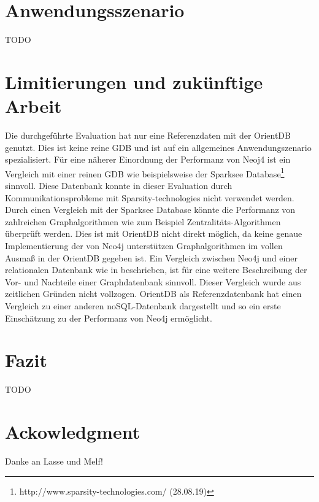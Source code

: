 \section{Anwendungsszenario}
TODO
\section{Limitierungen und zukünftige Arbeit}
Die durchgeführte Evaluation hat nur eine Referenzdaten mit der OrientDB genutzt. Dies ist keine reine GDB und ist auf ein allgemeines Anwendungszenario spezialisiert. Für eine näherer Einordnung der Performanz von Neoj4 ist ein Vergleich mit einer reinen GDB wie beispielsweise der Sparksee Database\footnote{http://www.sparsity-technologies.com/ (28.08.19)} sinnvoll. Diese Datenbank konnte in dieser Evaluation durch Kommunikationsprobleme mit Sparsity-technologies nicht verwendet werden. Durch einen Vergleich mit der Sparksee Database könnte die Performanz von zahlreichen Graphalgorithmen   wie zum Beispiel Zentralitäts-Algorithmen überprüft werden. Dies ist mit OrientDB nicht direkt möglich, da keine genaue Implementierung der von Neo4j unterstützen Graphalgorithmen im vollen Ausmaß in der OrientDB gegeben ist. \newline 
Ein Vergleich zwischen Neo4j und einer relationalen Datenbank wie in \parencite{vicknair2010comparison} beschrieben, ist für eine weitere Beschreibung der Vor- und Nachteile einer Graphdatenbank sinnvoll. Dieser Vergleich wurde aus zeitlichen Gründen nicht vollzogen. OrientDB als Referenzdatenbank hat einen Vergleich zu einer anderen noSQL-Datenbank dargestellt und so ein erste Einschätzung zu der Performanz von Neo4j ermöglicht.      
\section{Fazit}
TODO
\section{Ackowledgment}
Danke an Lasse und Melf!
